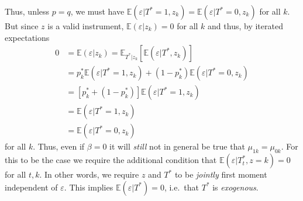 \documentclass[12pt]{article}
\begin{document}
Thus, unless $p = q$, we must have $\mathbb{E}(\varepsilon|T^*=1,z_k) = \mathbb{E}(\varepsilon|T^*=0,z_k)$ for all $k$.
But since $z$ is a valid instrument, $\mathbb{E}(\varepsilon|z_k) = 0$ for all $k$ and thus, by iterated expectations
\begin{align*}
  0 &= \mathbb{E}(\varepsilon|z_k) = \mathbb{E}_{T^*|z_k}\left[ \mathbb{E}(\varepsilon|T^*,z_k) \right]\\
  &= p^*_k \mathbb{E}(\varepsilon|T^*=1,z_k) + (1 - p_k^*) \mathbb{E}(\varepsilon|T^*=0,z_k)\\
  &= \left[ p_k^* + (1 - p_k^*) \right] \mathbb{E}(\varepsilon|T^*=1,z_k)\\
  &= \mathbb{E}(\varepsilon|T^*=1,z_k)\\
  &= \mathbb{E}(\varepsilon|T^*=0,z_k)
\end{align*}
for all $k$. 
Thus, even if $\beta = 0$ it will \emph{still} not in general be true that $\mu_{1k} = \mu_{0k}$.
For this to be the case we require the additional condition that $\mathbb{E}(\varepsilon|T^*_t,z = k) = 0$ for all $t,k$.
In other words, we require $z$ and $T^*$ to be \emph{jointly} first moment independent of $\varepsilon$.
This implies $\mathbb{E}(\varepsilon|T^*)=0$, i.e.\ that $T^*$ is \emph{exogenous}.
\end{document}
